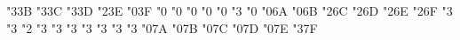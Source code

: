 \mathchardef \nRightarrow   "3\amsbfam 3B
\mathchardef \nLeftrightarrow   "3\amsbfam 3C
\mathchardef \nleftrightarrow   "3\amsbfam 3D
\mathchardef \divideontimes   "2\amsbfam 3E
\mathchardef \varnothing   "0\amsbfam 3F
\mathchardef \nexists   "0
\mathchardef \Finv   "0
\mathchardef \Game   "0
\mathchardef \mho   "0
\mathchardef \eth   "0
\mathchardef \eqsim   "3
\mathchardef \beth   "0
\mathchardef \gimel   "0\amsbfam 6A
\mathchardef \daleth   "0\amsbfam 6B
\mathchardef \lessdot   "2\amsbfam 6C
\mathchardef \gtrdot   "2\amsbfam 6D
\mathchardef \ltimes   "2\amsbfam 6E
\mathchardef \rtimes   "2\amsbfam 6F
\mathchardef \shortmid   "3
\mathchardef \shortparallel   "3
\mathchardef \smallsetminus   "2
\mathchardef \thicksim   "3
\mathchardef \thickapprox   "3
\mathchardef \approxeq   "3
\mathchardef \precapprox   "3
\mathchardef \succapprox   "3
\mathchardef \curvearrowleft   "3
\mathchardef \curvearrowright   "3
\mathchardef \digamma   "0\amsbfam 7A
\mathchardef \varkappa   "0\amsbfam 7B
\mathchardef \Bbbk   "0\amsbfam 7C
\mathchardef \hslash   "0\amsbfam 7D
\mathchardef \hbar   "0\amsbfam 7E
\mathchardef \backepsilon   "3\amsbfam 7F


